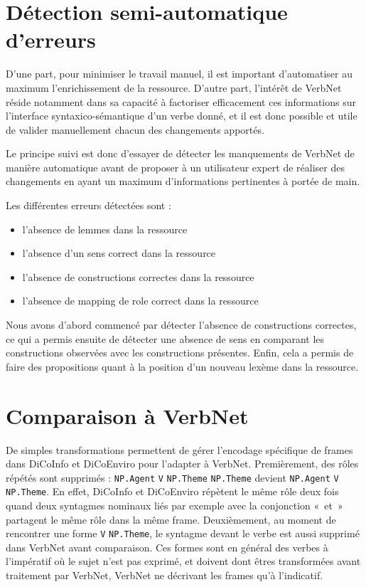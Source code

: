 \section{Détection semi-automatique d'erreurs}

D'une part, pour minimiser le travail manuel, il est important d'automatiser au
maximum l'enrichissement de la ressource. D'autre part, l'intérêt de VerbNet
réside notamment dans sa capacité à factoriser efficacement ces informations
sur l'interface syntaxico-sémantique d'un verbe donné, et il est donc possible
et utile de valider manuellement chacun des changements apportés.

Le principe suivi est donc d'essayer de détecter les manquements de VerbNet de
manière automatique avant de proposer à un utilisateur expert de réaliser des
changements en ayant un maximum d'informations pertinentes à portée de main.

Les différentes erreurs détectées sont :
\begin{itemize}
    \item l'absence de lemmes dans la ressource
    \item l'absence d'un sens correct dans la ressource
    \item l'absence de constructions correctes dans la ressource
    \item l'absence de mapping de role correct dans la ressource
\end{itemize}

Nous avons d'abord commencé par détecter l'absence de constructions correctes,
ce qui a permis ensuite de détecter une absence de sens en comparant les
constructions observées avec les constructions présentes. Enfin, cela a permis
de faire des propositions quant à la position d'un nouveau lexème dans la
ressource.


\fi


\section{Comparaison à VerbNet}
\label{comparaison_verbnet}

De simples transformations permettent de gérer l'encodage spécifique de frames
dans DiCoInfo et DiCoEnviro pour l'adapter à VerbNet. Premièrement, des rôles
répétés sont supprimés : \texttt{NP.Agent} \texttt{V} \texttt{NP.Theme}
\texttt{NP.Theme} devient \texttt{NP.Agent} \texttt{V} \texttt{NP.Theme}. En
effet, DiCoInfo et DiCoEnviro répètent le même rôle deux fois quand deux
syntagmes nominaux liés par exemple avec la conjonction «~et~» partagent le
même rôle dans la même frame. Deuxièmement, au moment de rencontrer une forme
\texttt{V} \texttt{NP.Theme}, le syntagme devant le verbe est aussi supprimé
dans VerbNet avant comparaison. Ces formes sont en général des verbes à
l'impératif où le sujet n'est pas exprimé, et doivent dont êtres transformées
avant traitement par VerbNet, VerbNet ne décrivant les frames qu'à l'indicatif.

